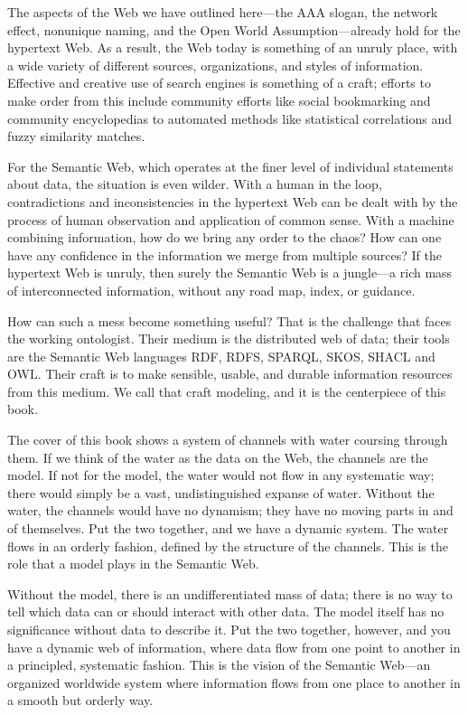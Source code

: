The aspects of the Web we have outlined here---the AAA slogan, the
network effect, nonunique naming, and the Open World
Assumption---already hold for the hypertext Web. As a result, the Web
today is something of an unruly place, with a wide variety of different
sources, organizations, and styles of information. Effective and
creative use of search engines is something of a craft; efforts to make
order from this include community efforts like social bookmarking and
community encyclopedias to automated methods like statistical
correlations and fuzzy similarity matches.

For the Semantic Web, which operates at the finer level of individual
statements about data, the situation is even wilder. With a human in the
loop, contradictions and inconsistencies in the hypertext Web can be
dealt with by the process of human observation and application of common
sense. With a machine combining information, how do we bring any order
to the chaos? How can one have any confidence in the information we
merge from multiple sources? If the hypertext Web is unruly, then surely
the Semantic Web is a jungle---a rich mass of interconnected
information, without any road map, index, or guidance.

How can such a mess become something useful? That is the challenge that
faces the working ontologist. Their medium is the distributed web of
data; their tools are the Semantic Web languages RDF, RDFS, SPARQL,
SKOS, SHACL and OWL. Their craft is to make sensible, usable, and
durable information resources from this medium. We call that craft
modeling, and it is the centerpiece of this book.

The cover of this book shows a system of channels with water coursing
through them. If we think of the water as the data on the Web, the
channels are the model. If not for the model, the water would not flow
in any systematic way; there would simply be a vast, undistinguished
expanse of water. Without the water, the channels would have no
dynamism; they have no moving parts in and of themselves. Put the two
together, and we have a dynamic system. The water flows in an orderly
fashion, defined by the structure of the channels. This is the role that
a model plays in the Semantic Web.

Without the model, there is an undifferentiated mass of data; there is
no way to tell which data can or should interact with other data. The
model itself has no significance without data to describe it. Put the
two together, however, and you have a dynamic web of information, where
data flow from one point to another in a principled, systematic fashion.
This is the vision of the Semantic Web---an organized worldwide system
where information flows from one place to another in a smooth but
orderly way.

